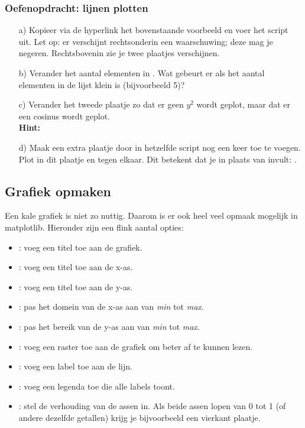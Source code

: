 \documentclass[a4paper,11pt, fleqn]{article}
\begin{document}

\subsubsection*{Oefenopdracht: lijnen plotten}
\begin{itemize}
	\item[a)] Kopieer via de hyperlink het bovenstaande voorbeeld en voer het script uit. Let op: er verschijnt rechtsonderin een waarschuwing; deze mag je negeren. Rechtsbovenin zie je twee plaatjes verschijnen.
	
	\item[b)] Verander het aantal elementen in . Wat gebeurt er als het aantal elementen in de lijst klein is (bijvoorbeeld 5)?

	\item[c)] Verander het tweede plaatje zo dat er geen $y^2$ wordt geplot, maar dat er een cosinus wordt geplot. \\
	{\bf Hint:} 

	\item[d)] Maak een extra plaatje door in hetzelfde script nog een keer  toe te voegen. Plot in dit plaatje  en  tegen elkaar. Dit betekent dat je in plaats van  invult: .
\end{itemize}

\subsection{Grafiek opmaken}

Een kale grafiek is niet zo nuttig. Daarom is er ook heel veel opmaak mogelijk in matplotlib. Hieronder zijn een flink aantal opties:

\begin{itemize}
	\item {}: voeg een titel toe aan de grafiek.
	\item {}: voeg een titel toe aan de x-as.
	\item {}: voeg een titel toe aan de y-as.
	\item {}: pas het domein van de x-as aan van {\it min} tot {\it max}.
	\item {}: pas het bereik van de y-as aan van {\it min} tot {\it max}.
	\item {}: voeg een raster toe aan de grafiek om beter af te kunnen lezen.
	\item {}: voeg een label toe aan de lijn.
	\item {}: voeg een legenda toe die alle labels toont.
	\item {}: stel de verhouding van de assen in. Als beide assen lopen van 0 tot 1 (of andere dezelfde getallen) krijg je bijvoorbeeld een vierkant plaatje.
\end{itemize}
\end{document}
